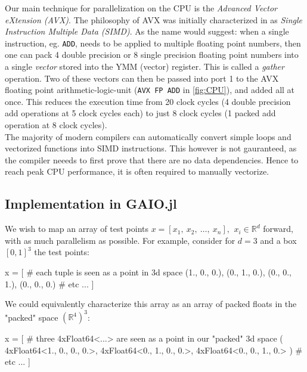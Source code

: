 Our main technique for parallelization on the CPU is the 
\emph{Advanced Vector eXtension (AVX)}. The philosophy of AVX was initially characterized 
in \cite*{simd} as \emph{Single Instruction Multiple Data (SIMD)}. As the name would 
suggest: when a single instruction, eg. \texttt{ADD}, needs to be applied to multiple 
floating point numbers, then one can pack 4 double precision or 8 single precision 
floating point numbers into a single \emph{vector} stored into the YMM (vector) register. 
This is called a \emph{gather} operation. 
Two of these vectors can then be passed into port 1 to the AVX floating point 
arithmetic-logic-unit (\texttt{AVX FP ADD} in \autoref{fig:CPU}), and added all at once. 
This reduces the execution time from 20 clock cycles (4 double precision add operations at 
5 clock cycles each) to just 8 clock cycles (1 packed add operation at 8 clock cycles). \\

The majority of modern compilers can automatically convert simple loops and vectorized 
functions into SIMD instructions. This however is not gauranteed, as the compiler neeeds 
to first prove that there are no data dependencies. Hence to reach peak CPU performance, 
it is often required to manually vectorize. 


\subsection{Implementation in GAIO.jl}

We wish to map an array of test points 
$x = [x_1,\ x_2,\ \ldots,\ x_n],\,\ x_i \in \mathbb{R}^d$ forward, with as much 
parallelism as possible. For example, consider for $d=3$ and a box $[0,1]^3$ the test 
points:

\begin{minipage}{\linewidth}
\begin{jllisting}[language=julia, style=jlcodestyle]
    x = [   # each tuple is seen as a point in 3d space
        (1., 0., 0.),
        (0., 1., 0.),
        (0., 0., 1.),
        (0., 0., 0.)
        # etc ...
    ]
\end{jllisting}
\end{minipage}

We could equivalently characterize this array as an array of packed floats in 
the "packed" space $(\mathbb{R}^4)^3$:

\begin{minipage}{\linewidth}
\begin{jllisting}[language=julia, style=jlcodestyle]
    x = [   # three 4xFloat64<...> are seen as a point in our "packed" 3d space
        (
            4xFloat64<1., 0., 0., 0.>, 
            4xFloat64<0., 1., 0., 0.>, 
            4xFloat64<0., 0., 1., 0.>
        )
        # etc ...
    ]
\end{jllisting}
\end{minipage}


